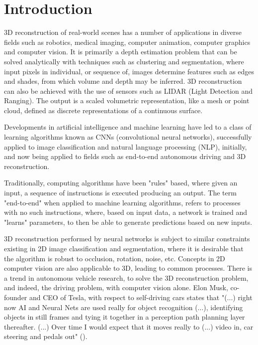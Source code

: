 \section{Introduction}
\label{introduction}

3D reconstruction of real-world scenes has a number of applications in diverse fields such as robotics, medical imaging, computer animation, computer graphics and computer vision. It is primarily a depth estimation problem that can be solved analytically with techniques such as clustering and segmentation, where input pixels in individual, or sequence of, images determine features such as edges and shades, from which volume and depth may be inferred. 3D reconstruction can also be achieved with the use of sensors such as LIDAR (Light Detection and Ranging). The output is a scaled volumetric representation, like a mesh or point cloud, defined as discrete representations of a continuous surface. 

Developments in artificial intelligence and machine learning have led to a class of learning algorithms known as CNNs (convolutional neural networks), successfully applied to image classification and natural language processing (NLP), initially, and now being applied to fields such as end-to-end autonomous driving and 3D reconstruction. 

Traditionally, computing algorithms have been "rules" based, where given an input, a sequence of instructions is executed producing an output. The term "end-to-end" when applied to machine learning algorithms, refers to processes with no such instructions, where, based on input data, a network is trained and "learns" parameters, to then be able to generate predictions based on new inputs.

3D reconstruction performed by neural networks is subject to similar constraints existing in 2D image classification and segmentation, where it is desirable that the algorithm is robust to occlusion, rotation, noise, etc. Concepts in 2D computer vision are also applicable to 3D, leading to common processes. There is a trend in autonomous vehicle research, to solve the 3D reconstruction problem, and indeed, the driving problem, with computer vision alone. Elon Musk, co-founder and CEO of Tesla, with respect to self-driving cars states that  "(...) right now AI and Neural Nets are used really for object recognition (...), identifying objects in still frames and tying it together in a perception path planning layer thereafter. (...) Over time I would expect that it moves really to (...) video in, car steering and pedals out" (\cite{TESLAADE:2019}). 

